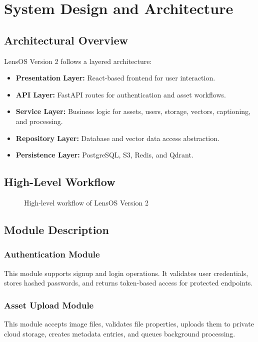 \documentclass[12pt,a4paper]{report}
\begin{document}
\chapter{System Design and Architecture}
\section{Architectural Overview}
LensOS Version 2 follows a layered architecture:
\begin{itemize}[leftmargin=*]
    \item \textbf{Presentation Layer:} React-based frontend for user interaction.
    \item \textbf{API Layer:} FastAPI routes for authentication and asset workflows.
    \item \textbf{Service Layer:} Business logic for assets, users, storage, vectors, captioning, and processing.
    \item \textbf{Repository Layer:} Database and vector data access abstraction.
    \item \textbf{Persistence Layer:} PostgreSQL, S3, Redis, and Qdrant.
\end{itemize}

\section{High-Level Workflow}
\begin{figure}[H]
\centering
{}
\caption{High-level workflow of LensOS Version 2}
\end{figure}

\section{Module Description}
\subsection{Authentication Module}
This module supports signup and login operations. It validates user credentials, stores hashed passwords, and returns token-based access for protected endpoints.

\subsection{Asset Upload Module}
This module accepts image files, validates file properties, uploads them to private cloud storage, creates metadata entries, and queues background processing.
\end{document}
